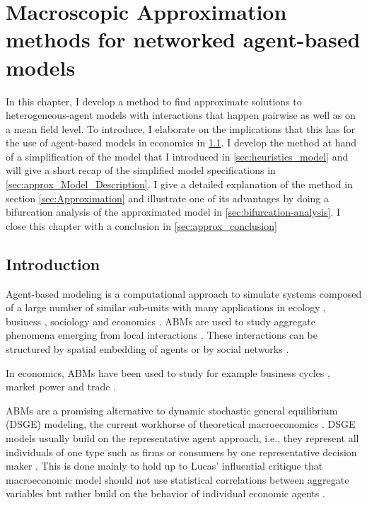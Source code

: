 \chapter{Macroscopic Approximation methods for networked agent-based models}
\label{chapter:approximation}
In this chapter, I develop a method to find approximate solutions to heterogeneous-agent models with interactions that happen pairwise as well as on a mean field level. To introduce, I elaborate on the implications that this has for the use of agent-based models in economics in \cref{sec:approx_intro}. I develop the method at hand of a simplification of the model that I introduced in \cref{sec:heuristics_model} and will give a short recap of the simplified model specifications in \cref{sec:approx_Model_Description}. I give a detailed explanation of the method in section \cref{sec:Approximation} and illustrate one of its advantages by doing a bifurcation analysis of the approximated model in \cref{sec:bifurcation-analysis}. I close this chapter with a conclusion in \cref{sec:approx_conclusion}


\section{Introduction}
\label{sec:approx_intro}

Agent-based modeling is a computational approach to simulate systems composed of a large number of similar sub-units with many applications in ecology \citep{Grimm2005}, business \citep{Bonabeau2002}, sociology \citep{Macy2002} and economics \citep{Tesfatsion2006, Hamill2015}.
ABMs are used to study aggregate phenomena emerging from local interactions \citep{Epstein1999}.
These interactions can be structured by spatial embedding of agents or by social networks \citep{Gross2008,Holme2006a,Bargigli2014}.

In economics, ABMs have been used to study for example business cycles \citep{DelliGatti2008}, market power \citep{Tesfatsion2006} and trade \citep{Hamill2015}.

ABMs are a promising alternative to dynamic stochastic general equilibrium (DSGE) modeling, the current workhorse of theoretical macroeconomics \citep{Farmer2009b}. 
DSGE models usually build on the representative agent approach, i.e., they represent all individuals of one type such as firms or consumers by one representative decision maker \citep{Hartley2002}. This is done mainly to hold up to Lucas' influential critique that macroeconomic model should not use statistical correlations between aggregate variables but rather build on the behavior of individual economic agents \citep{Janssen2016, Lucas1976}.

